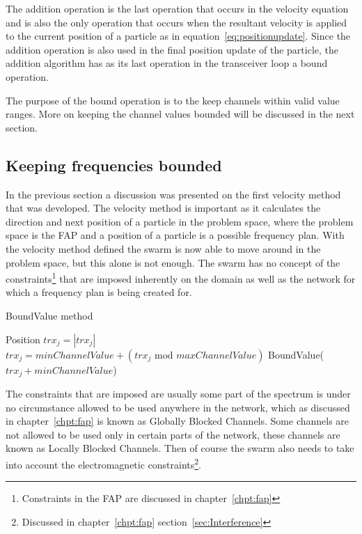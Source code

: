 The addition operation is the last operation that occurs in the velocity equation and is also the only operation that occurs when the resultant velocity is applied to the current position of a particle as in equation~\ref{eq:positionupdate}. Since the addition operation is also used in the final position update of the particle, the addition algorithm has as its last operation in the transceiver loop a bound operation. 

The purpose of the bound operation is to the keep channels within valid value ranges. More on keeping the channel values bounded will be discussed in the next section.
\subsection{Keeping frequencies bounded}
In the previous section a discussion was presented on the first velocity method that was developed. The velocity method is important as it calculates the direction and next position of a particle in the problem space, where the problem space is the FAP and a position of a particle is a possible frequency plan. With the velocity method defined the swarm is now able to move around in the problem space, but this alone is not enough. The swarm has no concept of the constraints\footnote{Constraints in the FAP are discussed in chapter~\ref{chpt:fap}} that are imposed inherently on the domain as well as the network for which a frequency plan is being created for.
\begin{algorithm}
\caption{BoundValue method}
\label{alg:boundvalue}
\begin{algorithmic}[1]
	\REQUIRE Position
			\STATE $trx_j = \left|trx_j\right|$
				\STATE $trx_j = minChannelValue + (\text{$trx_j$ mod $maxChannelValue$})$
			\ELSE 
					\STATE BoundValue($trx_j + minChannelValue$)
				\ENDIF
			\ENDIF
		\ENDFOR
	\ENDFOR
\end{algorithmic}
\end{algorithm}
The constraints that are imposed are usually some part of the spectrum is under no circumstance allowed to be used anywhere in the network, which as discussed in chapter~\ref{chpt:fap} is known as Globally Blocked Channels. Some channels are not allowed to be used only in certain parts of the network, these channels are known as Locally Blocked Channels. Then of course the swarm also needs to take into account the electromagnetic constraints\footnote{Discussed in chapter~\ref{chpt:fap} section~\ref{sec:Interference}}.

